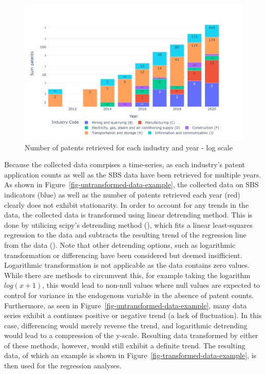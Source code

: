 \documentclass[
  11,
  a4paperpaper,
]{article}
\begin{document}
\begin{figure}[H]

{\centering \includegraphics{rieg2023_files/figure-pdf/fig-sum-patents-retrieved-output-1.jpeg}

}

\caption{\label{fig-sum-patents-retrieved}Number of patents retrieved
for each industry and year - log scale}

\end{figure}

Because the collected data comrpises a time-series, as each industry's
patent application counts as well as the SBS data have been retrieved
for multiple years. As shown in
Figure~\ref{fig-untransformed-data-example}, the collected data on SBS
indicators (blue) as well as the number of patents retrieved each year
(red) clearly does not exhibit stationarity. In order to account for any
trends in the data, the collected data is transformed using linear
detrending method. This is done by utilicing scipy's detrending method
(), which fits
a linear least-squares regression to the data and subtracts the
resulting trend of the regression line from the data
(). Note that other detrending options, such as
logarithmic transformation or differencing have been considered but
deemed insifficient. Logarithmic transformation is not applicable as the
data contains zero values. While there are methods to circumvent this,
for example taking the logarithm \(log(x+1)\), this would lead to
non-null values where null values are expected to control for variance
in the endogenous variable in the absence of patent counts. Furthermore,
as seen in Figure~\ref{fig-untransformed-data-example}, many data series
exhibit a continues positive or negative trend (a lack of fluctuation).
In this case, differencing would merely reverse the trend, and
logarithmic detrending would lead to a compression of the y-scale.
Resulting data transformed by either of these methods, however, would
still exhibit a definite trend. The resulting data, of which an example
is shown in Figure~\ref{fig-transformed-data-example}, is then used for
the regression analyses.
\end{document}
